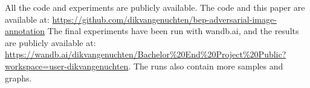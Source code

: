 All the code and experiments are publicly available.
The code and this paper are available at: \url{https://github.com/dikvangenuchten/bep-adversarial-image-annotation}
The final experiments have been run with wandb.ai, and the results are publicly available at: \url{https://wandb.ai/dikvangenuchten/Bachelor%20End%20Project%20Public?workspace=user-dikvangenuchten}. The runs also contain more samples and graphs.
